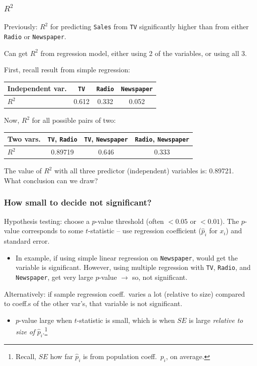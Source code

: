 \documentclass{beamer}
\theoremstyle{example}
\newcommand{\ttt}[1]{{\small\texttt{#1}}}
\begin{document}
\begin{frame}
\frametitle{$R^2$}
Previously: $R^2$ for predicting \ttt{Sales} from \ttt{TV} significantly higher than from either \ttt{Radio} or \ttt{Newspaper}. 

\pause
Can get $R^2$ from regression model, either using 2 of the variables, or using all 3. 

First, recall result from simple regression:
\begin{center}
    \begin{tabular}{l c c c}
        Independent var. & \ttt{TV} & \ttt{Radio} & \ttt{Newspaper} \\ 
        \hline 
        $R^2$       &  0.612  &  0.332  &  0.052
    \end{tabular}
\end{center}

\pause
Now, $R^2$ for all possible pairs of two:
\begin{center}
    \begin{tabular}{l c c c}
        Two vars. & \ttt{TV}, \ttt{Radio} & \ttt{TV}, \ttt{Newspaper} & \ttt{Radio}, \ttt{Newspaper} \\ 
        \hline 
        $R^2$       &  0.89719  &  0.646  &  0.333
    \end{tabular}
\end{center}

\pause
The value of $R^2$ with all three predictor (independent) variables is: 0.89721. {\color{strings}What conclusion can we draw?}

\end{frame}

\begin{frame}
    \frametitle{How small to decide not significant?}
    
    \pause 
    Hypothesis testing: choose a $p$-value threshold (often $<0.05$ or $<0.01$). The $p$-value corresponds to some $t$-statistic {--} use regression coefficient ($\hat{p}_i$ for $x_i$) and standard error.
    \begin{itemize}
        \item In example, if using simple linear regression on \ttt{Newspaper}, would get the variable is significant. However, using multiple regression with \ttt{TV}, \ttt{Radio}, and \ttt{Newspaper}, get very large $p$-value $\to$ so, not significant.
    \end{itemize}
    \vfill

    \pause 
    Alternatively: if sample regression coeff.\ varies a lot (relative to size) compared to coeff.s of the other var's, that variable is not significant.  
    \pause
    \begin{itemize}
        \item $p$-value large when $t$-statistic is small, which is when $SE$ is large \emph{relative to size of }$\hat{p}_i$.\qquad\footnote{Recall, $SE$ how far $\hat{p}_i$ is from population coeff.\ $p_i$, on average.}
    \end{itemize}
\end{frame}
\end{document}

